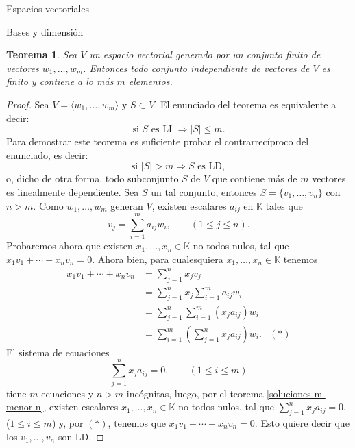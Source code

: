 \documentclass[a4paper,12pt,twoside,spanish,reqno]{amsbook}
\numberwithin{equation}{section}
\newtheorem{teorema}{Teorema}[section]
\theoremstyle{definition}
\theoremstyle{remark}
\newcommand{\la}{\langle}
\newcommand{\ra}{\rangle}
\newcommand{\K}{\mathbb K}
\begin{document}
\begin{chapter}{Espacios vectoriales}
\begin{section}{Bases y dimensión}
\begin{teorema}\label{indep-menorigual-gen}
    Sea $V$ un espacio vectorial generado por un conjunto finito de vectores $w_1,\ldots,w_m$. Entonces todo conjunto independiente de vectores de $V$ es finito y  contiene a lo más $m$ elementos. 
\end{teorema}
\begin{proof} Sea $V = \la w_1,\ldots,w_m\ra$ y  $S \subset V$.   El  enunciado del teorema es equivalente a decir:
    $$
    \text{si }S \text{ es LI } \Rightarrow |S| \le m.
    $$
    Para demostrar este teorema es suficiente probar el contrarrecíproco del enunciado, es decir:
    $$
    \text{si }|S| > m \Rightarrow S \text{ es LD},
    $$
    o, dicho  de otra forma, todo subconjunto $S$ de $V$ que contiene más de $m$ vectores es linealmente dependiente. Sea $S$ un tal conjunto,  entonces $S = \{v_1,\ldots,v_n\}$ con $n >m$.  Como  $w_1,\ldots,w_m$ generan $V$, existen escalares $a_{ij}$ en $\K$ tales que
    \begin{equation*}
        v_j = \sum_{i=1}^{m}a_{ij}w_i, \qquad (1 \le j \le n).
    \end{equation*}
    Probaremos ahora que existen $x_1,\ldots,x_n \in \K$ no todos nulos, tal que $x_1v_1 + \cdots+x_nv_n =0$. Ahora bien, para cualesquiera $x_1,\ldots,x_n \in \K$ tenemos
    \begin{align*}
        x_1v_1 + \cdots+x_nv_n &= \sum_{j=1}^{n} x_jv_j& \\
        & = \sum_{j=1}^{n}x_j \sum_{i=1}^{m}a_{ij}w_i& \\
        & = \sum_{j=1}^{n} \sum_{i=1}^{m}(x_ja_{ij})w_i& \\ 
        & = \sum_{i=1}^{m}(\sum_{j=1}^{n} x_ja_{ij})w_i.&  (*)
    \end{align*}
    El sistema de ecuaciones
    \begin{equation*}
        \sum_{j=1}^{n} x_ja_{ij} = 0, \qquad (1 \le i \le m) 
    \end{equation*}
    tiene $m$ ecuaciones  y $n > m$ incógnitas, luego, por el teorema \ref{soluciones-m-menor-n}, existen escalares $x_1,\ldots,x_n \in \K$ no todos nulos, tal que $\sum_{j=1}^{n} x_ja_{ij} = 0$, ($1 \le i \le m$) y, por $(*)$, tenemos que  $x_1v_1 + \cdots+x_nv_n =0$. Esto quiere decir que los $v_1,\ldots,v_n$ son LD.
\end{proof}



\end{section}
\end{chapter}
\end{document}
